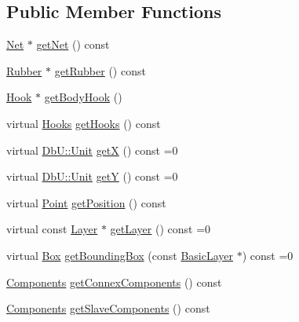 \subsection*{Public Member Functions}
\begin{DoxyCompactItemize}
\item 
\hyperlink{classHurricane_1_1Net}{Net} $\ast$ \hyperlink{classHurricane_1_1Component_a16607d07d915781dc4f5e6663cd7dd0a}{get\-Net} () const 
\item 
\hyperlink{classHurricane_1_1Rubber}{Rubber} $\ast$ \hyperlink{classHurricane_1_1Component_ae8b0d8c3b29b2e0eef4267375f8edf49}{get\-Rubber} () const 
\item 
\hyperlink{classHurricane_1_1Hook}{Hook} $\ast$ \hyperlink{classHurricane_1_1Component_a19f06d7cad163bab3b97a13f4736c9d1}{get\-Body\-Hook} ()
\item 
virtual \hyperlink{namespaceHurricane_a9dcd9b74dc5e2b51bec7a13c25807e02}{Hooks} \hyperlink{classHurricane_1_1Component_a19b5dd0a4e485f21c1ae01aa84a8fc95}{get\-Hooks} () const 
\item 
virtual \hyperlink{group__DbUGroup_ga4fbfa3e8c89347af76c9628ea06c4146}{Db\-U\-::\-Unit} \hyperlink{classHurricane_1_1Component_a0f8299ed73705fd4fbf56589dcc7e074}{get\-X} () const =0
\item 
virtual \hyperlink{group__DbUGroup_ga4fbfa3e8c89347af76c9628ea06c4146}{Db\-U\-::\-Unit} \hyperlink{classHurricane_1_1Component_a727da3f127c3a7a0a09468219f98c3e6}{get\-Y} () const =0
\item 
virtual \hyperlink{classHurricane_1_1Point}{Point} \hyperlink{classHurricane_1_1Component_ac6527d83ce44ae4147fce4ceb88c3602}{get\-Position} () const 
\item 
virtual const \hyperlink{classHurricane_1_1Layer}{Layer} $\ast$ \hyperlink{classHurricane_1_1Component_ab451ef19059e6e5bbb77ae391d02a039}{get\-Layer} () const =0
\item 
virtual \hyperlink{classHurricane_1_1Box}{Box} \hyperlink{classHurricane_1_1Component_aabb87b9ef71f71cea681a03a6213f616}{get\-Bounding\-Box} (const \hyperlink{classHurricane_1_1BasicLayer}{Basic\-Layer} $\ast$) const =0
\item 
\hyperlink{namespaceHurricane_a7d26d99aeb5dd6d70d51bd35d2473e72}{Components} \hyperlink{classHurricane_1_1Component_a36b839d17452e18f67f56e32c96068c1}{get\-Connex\-Components} () const 
\item 
\hyperlink{namespaceHurricane_a7d26d99aeb5dd6d70d51bd35d2473e72}{Components} \hyperlink{classHurricane_1_1Component_a31b77ba995b667ea8dcde7d2044b5d65}{get\-Slave\-Components} () const 
\end{DoxyCompactItemize}
